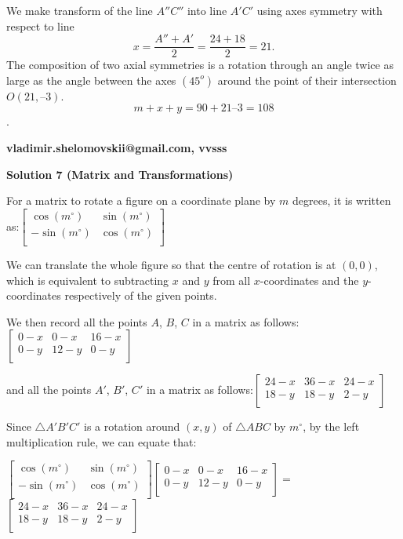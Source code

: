 \begin{enumerate}
 We make transform of the line $A''C''$ into line $A'C'$ using axes symmetry with respect to line
 \[x  = \frac {A'' + A'}{2} = \frac {24 + 18}{2} = 21.\]The composition of two axial symmetries is a rotation through an angle twice as large as the angle between the axes $(45^o)$ around the point of their intersection $O(21, – 3).$ 
 \[m + x + y = 90 + 21 – 3 = \boxed {108}\].

 \textbf{vladimir.shelomovskii@gmail.com, vvsss}

 



\textbf{Solution 7 (Matrix and Transformations)}

For a matrix to rotate a figure on a coordinate plane by $m$ degrees, it is written as:$\left[ {\begin{array}{cc}  \cos(m^{\circ}) & \sin(m^{\circ})  \\  -\sin(m^{\circ}) & \cos(m^{\circ})  \\  \end{array} } \right]$

 We can translate the whole figure so that the centre of rotation is at $(0,0)$, which is equivalent to subtracting $x$ and $y$ from all $x$-coordinates and the $y$-coordinates respectively of the given points.

 We then record all the points $A$, $B$, $C$ in a matrix as follows:$\left[ {\begin{array}{ccc}  0-x & 0-x & 16-x  \\  0-y & 12-y & 0-y  \\  \end{array} } \right]$

 and all the points $A'$, $B'$, $C'$ in a matrix as follows:$\left[ {\begin{array}{ccc}  24-x & 36-x & 24-x  \\  18-y & 18-y & 2-y  \\  \end{array} } \right]$

 Since $\triangle A'B'C'$ is a rotation around $(x,y)$ of $\triangle ABC$ by $m^{\circ}$, by the left multiplication rule, we can equate that:

 $\left[ {\begin{array}{cc}  \cos(m^{\circ}) & \sin(m^{\circ})  \\  -\sin(m^{\circ}) & \cos(m^{\circ})  \\  \end{array} } \right]$$\left[ {\begin{array}{ccc}  0-x & 0-x & 16-x  \\  0-y & 12-y & 0-y  \\  \end{array} } \right]$$=$$\left[ {\begin{array}{ccc}  24-x & 36-x & 24-x  \\  18-y & 18-y & 2-y  \\  \end{array} } \right]$


\end{enumerate}
